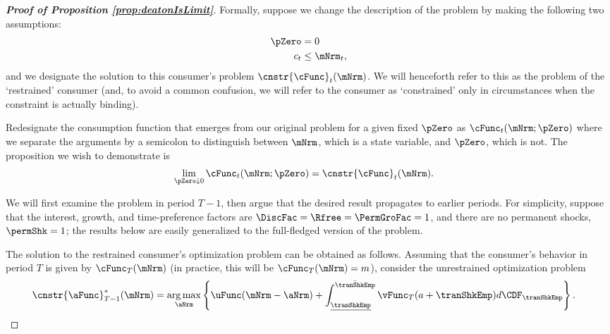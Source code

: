 \documentclass[\econtexRoot/BufferStockTheory]{subfiles}
\begin{document}
\begin{proof}[\textbf{Proof of Proposition \ref{prop:deatonIsLimit}}]
Formally, suppose we change the description of the problem by making
the following two assumptions:
\begin{eqnarray*}
  \pZero   & = 0
  \\  c_{t} & \leq  \mNrm_{t} \label{eq:liqconstr},
\end{eqnarray*}
and we designate the solution to this consumer's problem $\cnstr{\cFunc}_{t}(\mNrm)$.  We will henceforth refer to this as the problem of the `restrained' consumer (and, to avoid a common confusion, we will refer to the consumer as `constrained' only in circumstances when the constraint is actually binding).

Redesignate the consumption function that emerges from our original problem for a given fixed $\pZero$ as $\cFunc_{t}(\mNrm;\pZero)$ where we separate the arguments by a semicolon to distinguish between $\mNrm$, which is a state variable, and $\pZero$, which is not.  The proposition we wish to demonstrate is
\begin{equation}\begin{gathered}\begin{aligned}
      \lim_{\pZero \downarrow 0} \cFunc_{t}(\mNrm;\pZero)  & = \cnstr{\cFunc}_{t}(\mNrm). \label{eq:RestrEqUnrestr} 
    \end{aligned}\end{gathered}\end{equation}

We will first examine the problem in period $T-1$, then argue that the desired result propagates to earlier periods.  For simplicity, suppose that the interest, growth, and time-preference factors are $\DiscFac = \Rfree = \PermGroFac = 1$, and there are no permanent shocks, $\permShk=1$; the results below are easily generalized to the full-fledged version of the problem.

The solution to the restrained consumer's optimization problem can be obtained as follows.  Assuming that the consumer's behavior in period $T$ is given by $\cFunc_{T}(\mNrm)$ (in practice, this will be $\cFunc_{T}(\mNrm)=m$), consider the unrestrained optimization problem
\begin{equation}\begin{gathered}\begin{aligned}
      \cnstr{\aFunc}^{*}_{T-1}(\mNrm)  & = \underset{\aNrm}{\arg \max} \left\{\uFunc(\mNrm-\aNrm) +  \int_{\underline{\tranShkEmp}}^{\bar{\tranShkEmp}} \vFunc_{T}(a+\tranShkEmp) d\CDF_{\tranShkEmp} \right\}. \label{eq:vUnconstr}
    \end{aligned}\end{gathered}\end{equation}


\end{proof}
\end{document}
